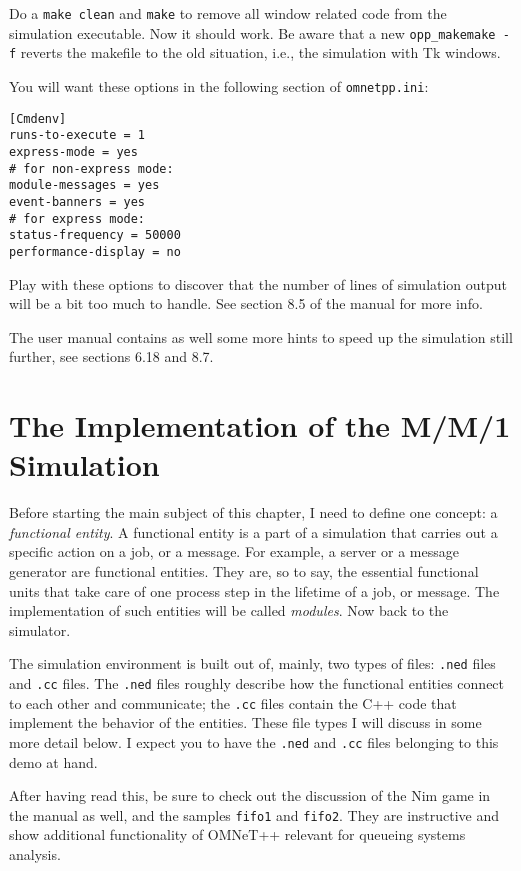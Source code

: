 \documentclass[a4paper]{article}
\begin{document}
Do a \texttt{make clean} and \texttt{make} to remove all window
related code from the simulation executable. Now it should work. Be
aware that a new \texttt{opp\_makemake -f} reverts the makefile to the old
situation, i.e., the simulation with Tk windows.

You will want these options in the following section of
\texttt{omnetpp.ini}:
\begin{verbatim}
[Cmdenv]
runs-to-execute = 1
express-mode = yes
# for non-express mode:
module-messages = yes
event-banners = yes
# for express mode:
status-frequency = 50000
performance-display = no
\end{verbatim}
Play with these options to discover that the number of lines of
simulation output will be a bit too much to handle. See section 8.5 of
the manual for more info.

The user manual contains as well some more hints to speed up the
simulation still further, see sections 6.18 and  8.7.

\section{The Implementation of the M/M/1 Simulation}
\label{sec:impl-fifo-simul}
Before starting the main subject of this chapter, I need to define one
concept: a \emph{functional entity}. A functional entity is a part of
a simulation that carries out a specific action on a job, or a
message. For example, a server or a message generator are functional
entities. They are, so to say, the essential functional units that take
care of one process step in the lifetime of a job, or message. The
implementation of such entities will be called \emph{modules}. Now
back to the simulator.

The simulation environment is built out of, mainly, two types of
files: \texttt{.ned} files and \texttt{.cc} files.  The \texttt{.ned}
files roughly describe how the functional entities connect to each
other and communicate; the \texttt{.cc} files contain the C++ code
that implement the behavior of the entities. These file types I will
discuss in some more detail below. I expect you to have the
\texttt{.ned} and \texttt{.cc} files belonging to this demo at hand.

After having read this, be sure to check out the discussion of the Nim
game in the manual as well, and the samples \texttt{fifo1} and
\texttt{fifo2}.  They are instructive and show additional
functionality of OMNeT++ relevant for queueing systems analysis.
\end{document}
